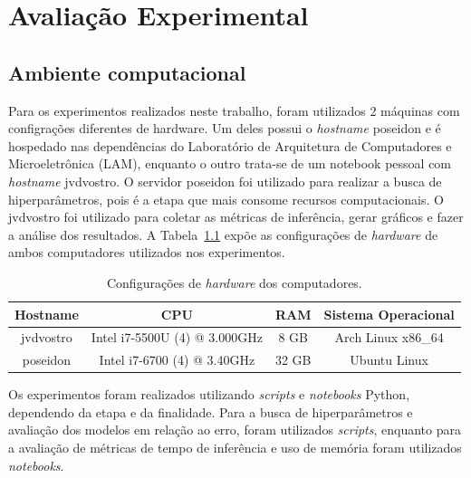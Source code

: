 \chapter{Avaliação Experimental}
\section{Ambiente computacional}
Para os experimentos realizados neste trabalho, foram utilizados 2 máquinas com configrações diferentes de hardware. Um deles possui o \textit{hostname} poseidon e é hospedado nas dependências do Laboratório de Arquitetura de Computadores e Microeletrônica (LAM), enquanto o outro trata-se de um notebook pessoal com \textit{hostname} jvdvostro. O servidor poseidon foi utilizado para realizar a busca de hiperparâmetros, pois é a etapa que mais consome recursos computacionais. O jvdvostro foi utilizado para coletar as métricas de inferência, gerar gráficos e fazer a análise dos resultados. A Tabela~\ref{tab:hardware} expõe as configurações de \textit{hardware} de ambos computadores utilizados nos experimentos.

\begin{table}[!htp]
    \caption{Configurações de \textit{hardware} dos computadores.}
    \label{tab:hardware}
    \setlength\extrarowheight{5pt}
    \centering
    \begin{tabular}{|c|c|c|c|}
        \hline
        \rowcolor[HTML]{C0C0C0}
        Hostname  & CPU                           & RAM   & Sistema Operacional \\ \hline
        jvdvostro & Intel i7-5500U (4) @ 3.000GHz & 8 GB  & Arch Linux x86\_64  \\ \hline
        poseidon  & Intel i7-6700 (4) @ 3.40GHz   & 32 GB & Ubuntu Linux        \\ \hline
    \end{tabular}
\end{table}

Os experimentos foram realizados utilizando \textit{scripts} e \textit{notebooks} Python, dependendo da etapa e da finalidade. Para a busca de hiperparâmetros e avaliação dos modelos em relação ao erro, foram utilizados \textit{scripts}, enquanto para a avaliação de métricas de tempo de inferência e uso de memória foram utilizados \textit{notebooks}.

